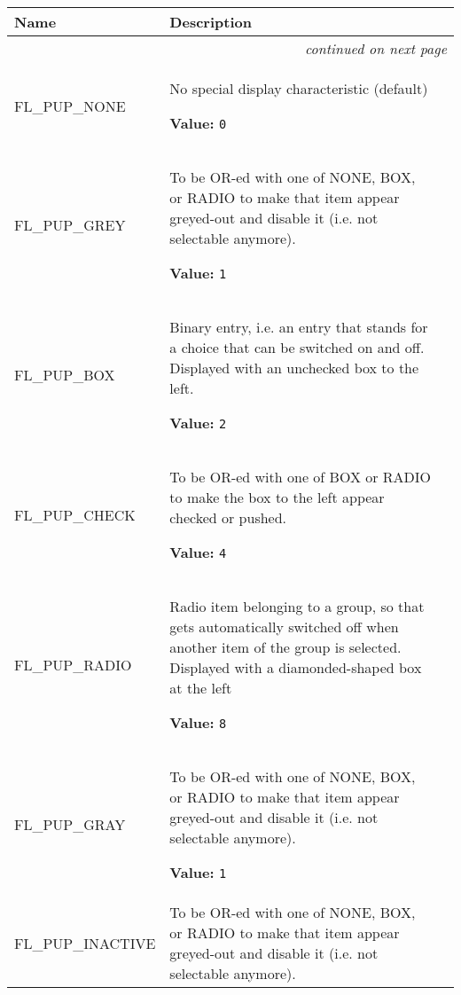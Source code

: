     \vspace{-1cm}
\hspace{\varindent}\begin{longtable}{|p{\varnamewidth}|p{\vardescrwidth}|l}
\cline{1-2}
\cline{1-2} \centering \textbf{Name} & \centering \textbf{Description}& \\
\cline{1-2}
\endhead\cline{1-2}\multicolumn{3}{r}{\small\textit{continued on next page}}\\\endfoot\cline{1-2}
\endlastfoot\raggedright F\-L\-\_\-P\-U\-P\-\_\-N\-O\-N\-E\- & \raggedright No special display characteristic (default)

\textbf{Value:} 
{\tt 0}&\\
\cline{1-2}
\raggedright F\-L\-\_\-P\-U\-P\-\_\-G\-R\-E\-Y\- & \raggedright To be OR-ed with one of NONE, BOX, or RADIO to make that item appear
greyed-out and disable it (i.e. not selectable anymore).

\textbf{Value:} 
{\tt 1}&\\
\cline{1-2}
\raggedright F\-L\-\_\-P\-U\-P\-\_\-B\-O\-X\- & \raggedright Binary entry, i.e. an entry that stands for a choice that can be switched
on and off. Displayed with an unchecked box to the left.

\textbf{Value:} 
{\tt 2}&\\
\cline{1-2}
\raggedright F\-L\-\_\-P\-U\-P\-\_\-C\-H\-E\-C\-K\- & \raggedright To be OR-ed with one of BOX or RADIO to make the box to the left appear
checked or pushed.

\textbf{Value:} 
{\tt 4}&\\
\cline{1-2}
\raggedright F\-L\-\_\-P\-U\-P\-\_\-R\-A\-D\-I\-O\- & \raggedright Radio item belonging to a group, so that gets automatically switched off
when another item of the group is selected. Displayed with a diamonded-shaped
box at the left

\textbf{Value:} 
{\tt 8}&\\
\cline{1-2}
\raggedright F\-L\-\_\-P\-U\-P\-\_\-G\-R\-A\-Y\- & \raggedright To be OR-ed with one of NONE, BOX, or RADIO to make that item appear
greyed-out and disable it (i.e. not selectable anymore).

\textbf{Value:} 
{\tt 1}&\\
\cline{1-2}
\raggedright F\-L\-\_\-P\-U\-P\-\_\-I\-N\-A\-C\-T\-I\-V\-E\- & \raggedright To be OR-ed with one of NONE, BOX, or RADIO to make that item appear
greyed-out and disable it (i.e. not selectable anymore).


\end{longtable}
